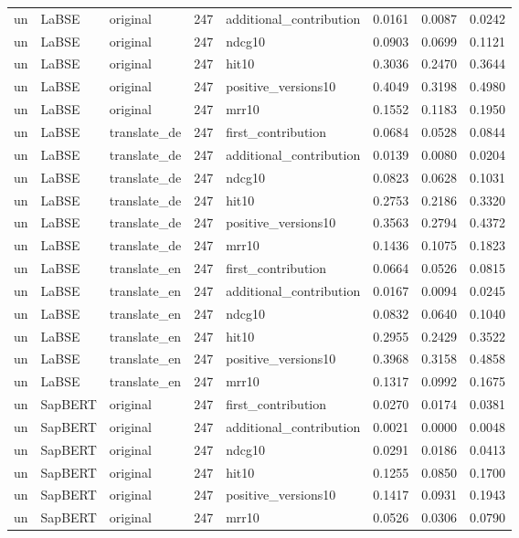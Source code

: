 \begin{tabular}{lllrlrrr}
un & LaBSE & original & 247 & additional\_contribution & 0.0161 & 0.0087 & 0.0242 \\
un & LaBSE & original & 247 & ndcg10 & 0.0903 & 0.0699 & 0.1121 \\
un & LaBSE & original & 247 & hit10 & 0.3036 & 0.2470 & 0.3644 \\
un & LaBSE & original & 247 & positive\_versions10 & 0.4049 & 0.3198 & 0.4980 \\
un & LaBSE & original & 247 & mrr10 & 0.1552 & 0.1183 & 0.1950 \\
un & LaBSE & translate\_de & 247 & first\_contribution & 0.0684 & 0.0528 & 0.0844 \\
un & LaBSE & translate\_de & 247 & additional\_contribution & 0.0139 & 0.0080 & 0.0204 \\
un & LaBSE & translate\_de & 247 & ndcg10 & 0.0823 & 0.0628 & 0.1031 \\
un & LaBSE & translate\_de & 247 & hit10 & 0.2753 & 0.2186 & 0.3320 \\
un & LaBSE & translate\_de & 247 & positive\_versions10 & 0.3563 & 0.2794 & 0.4372 \\
un & LaBSE & translate\_de & 247 & mrr10 & 0.1436 & 0.1075 & 0.1823 \\
un & LaBSE & translate\_en & 247 & first\_contribution & 0.0664 & 0.0526 & 0.0815 \\
un & LaBSE & translate\_en & 247 & additional\_contribution & 0.0167 & 0.0094 & 0.0245 \\
un & LaBSE & translate\_en & 247 & ndcg10 & 0.0832 & 0.0640 & 0.1040 \\
un & LaBSE & translate\_en & 247 & hit10 & 0.2955 & 0.2429 & 0.3522 \\
un & LaBSE & translate\_en & 247 & positive\_versions10 & 0.3968 & 0.3158 & 0.4858 \\
un & LaBSE & translate\_en & 247 & mrr10 & 0.1317 & 0.0992 & 0.1675 \\
un & SapBERT & original & 247 & first\_contribution & 0.0270 & 0.0174 & 0.0381 \\
un & SapBERT & original & 247 & additional\_contribution & 0.0021 & 0.0000 & 0.0048 \\
un & SapBERT & original & 247 & ndcg10 & 0.0291 & 0.0186 & 0.0413 \\
un & SapBERT & original & 247 & hit10 & 0.1255 & 0.0850 & 0.1700 \\
un & SapBERT & original & 247 & positive\_versions10 & 0.1417 & 0.0931 & 0.1943 \\
un & SapBERT & original & 247 & mrr10 & 0.0526 & 0.0306 & 0.0790 \\

\end{tabular}
